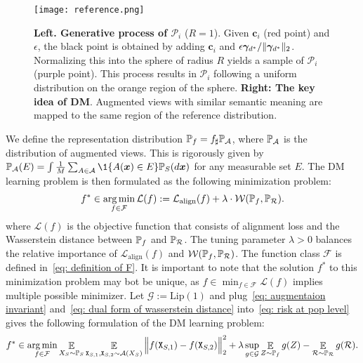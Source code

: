 \begin{figure}[ht]
    \centering
    \texttt{[image: reference.png]}
    \caption{\textbf{Left. Generative process of $\mathcal{P}_i$} ($R = 1$). Given $\bm{c}_i$ (red point) and $\epsilon$, the black point is obtained by adding $\bm{c}_i$ and $\epsilon \bm{\gamma}_{d^*}/\norm{\bm{\gamma}_{d^*}}_2$. Normalizing this into the sphere of radius $R$ yields a sample of $\mathcal{P}_i$ (purple point). This process results in $\mathcal{P}_i$ following a uniform distribution on the orange region of the sphere. \textbf{Right: The key idea of DM}. Augmented views with similar semantic meaning are mapped to the same region of the reference distribution.}
    \label{fig: reference}
\end{figure}

We define the representation distribution $\P_f = f_\sharp\P_\mathcal{A}$, where $\P_\mathcal{A}$ is the distribution of augmented views. This is rigorously given by $\P_\mathcal{A}(E) = \int\frac{1}{M}\sum_{A \in \mathcal{A}}\1\{A(\bm{x}) \in E\}\P_S(d\bm{x})$ for any measurable set $E$. The DM learning problem is then formulated as the following minimization problem:  
\begin{align}\label{eq: risk at pop level}
    f^* \in \argmin_{f \in \mathcal{F}}\mathcal{L}(f) := \mathcal{L}_{\mathrm{align}}(f) + \lambda \cdot \mathcal{W}(\P_f, \P_\mathcal{R}).
\end{align}
where $\mathcal{L}(f)$ is the objective function that consists of alignment loss and the Wasserstein distance between $\P_f$ and $\P_\mathcal{R}$. The tuning parameter $\lambda > 0$ balances the relative importance of $\mathcal{L}_{\mathrm{align}}(f)$ and $\mathcal{W}(\P_f, \P_\mathcal{R})$. The function class $\mathcal{F}$ is defined in~\eqref{eq: definition of F}. It is important to note that the solution $f^*$ to this minimization problem may bot be unique, as $f\in \min_{f \in \mathcal{F}}\mathcal{L}(f)$ implies multiple possible minimizer. Let $\mathcal{G} := \mathrm{Lip(1)}$ and plug~\eqref{eq: augmentaion invariant} and~\eqref{eq: dual form of wasserstein distance} into~\eqref{eq: risk at pop level} gives the following formulation of the DM learning problem:
\begin{align}
\label{eq: risk at pop level (specific version)}
f^* \in \argmin_{f \in \mathcal{F}} \mathop{\E}_{X_S \sim \P_S} \mathop{\E}_{\mathtt{X}_{S,1}, \mathtt{X}_{S,2} \sim \mathcal{A}(X_S)} \Big\Vert f(\mathtt{X}_{S,1}) - f(\mathtt{X}_{S,2}) \Big\Vert_2^2 + \lambda \sup_{g \in \mathcal{G}} \mathop{\E}_{Z \sim \P_f} g(Z)  - \mathop{\E}_{\mathcal{R} \sim \P_\mathcal{R}} g(\mathcal{R}).
\end{align}
